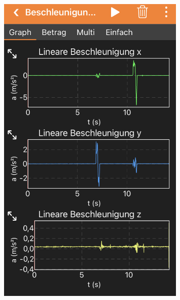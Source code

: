 \documentclass{beamer}
\begin{document}
\begin{frame}
\begin{columns}
\begin{figure}[htpb]
            \includegraphics[width=0.8\textwidth]{acc_phyphox3}
        \end{figure}
    \end{columns}
\end{frame}
\end{document}

